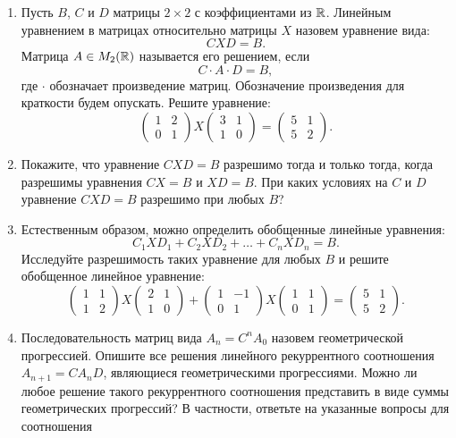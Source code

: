 
\begin{enumerate}
\item Пусть $B$, $C$ и $D$ матрицы $2\times 2$ с коэффициентами из $\mathbb{R}$. Линейным уравнением в матрицах относительно матрицы $X$ назовем уравнение вида: 
$$CXD=B.$$
Матрица $A\in M_2(\mathbb{R})$ называется его решением, если 
$$C\cdot A\cdot D=B,$$
где $\cdot$ обозначает произведение матриц. Обозначение произведения для краткости будем опускать.
Решите уравнение:
$$\left(\begin{smallmatrix} 1&2\\ 0&1 \end{smallmatrix}\right) X \left(\begin{smallmatrix} 3&1\\ 1&0 \end{smallmatrix}\right) =
\left(\begin{smallmatrix} 5&1\\ 5&2 \end{smallmatrix}\right) .$$
\item Покажите, что уравнение $CXD=B$ разрешимо тогда и только тогда, когда разрешимы уравнения $CX=B$ и $XD=B$. При каких условиях на $C$ и $D$ уравнение $CXD=B$ разрешимо при любых $B$?
\item Естественным образом, можно определить обобщенные линейные уравнения:
$$C_1 X D_1+ C_2 X D_2+\dots+ C_n X D_n=B.$$
Исследуйте разрешимость таких уравнение для любых $B$ и решите обобщенное линейное уравнение:
$$\left(\begin{smallmatrix} 1&1\\ 1&2 \end{smallmatrix}\right) X \left(\begin{smallmatrix} 2&1\\ 1&0 \end{smallmatrix}\right) + \left(\begin{smallmatrix} 1&-1\\ 0&1 \end{smallmatrix}\right) X \left(\begin{smallmatrix} 1&1\\ 0&1 \end{smallmatrix}\right) =
\left(\begin{smallmatrix} 5&1\\ 5&2 \end{smallmatrix}\right).$$
\item Последовательность матриц вида $A_n=C^nA_0$ назовем геометрической прогрессией. Опишите все решения линейного рекуррентного соотношения $A_{n+1}=CA_nD$, являющиеся геометрическими прогрессиями. Можно ли любое решение такого рекуррентного соотношения представить в виде суммы геометрических прогрессий? В частности, ответьте на указанные вопросы для соотношения

\end{enumerate}
